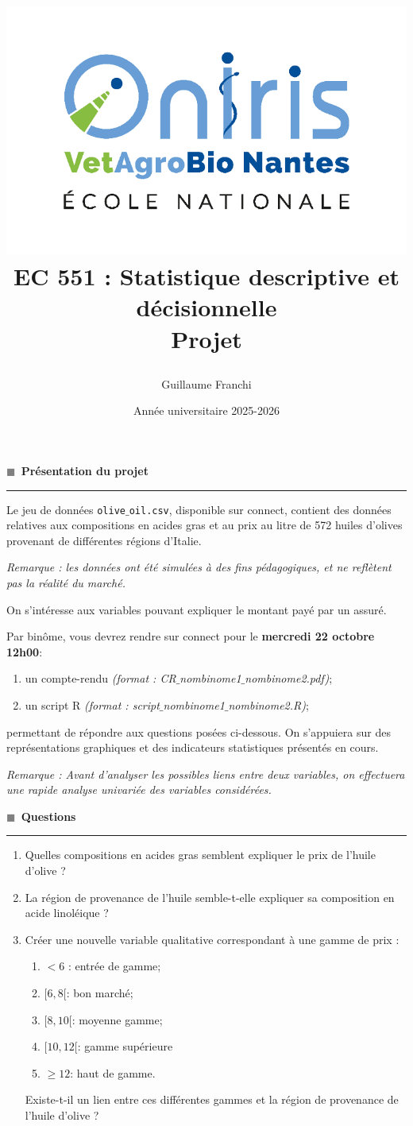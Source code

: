 \documentclass[a4paper,12pt]{article}
\title{\begin{normalsize}\textbf{
\includegraphics[scale=0.25]{logo_oniris.png} \\
EC 551 : Statistique descriptive et décisionnelle
 \\ Projet}
\end{normalsize}}
\author{{\small Guillaume Franchi}}
\date{{\small Année universitaire 2025-2026}}
\makeatletter
\newcommand{\greysquare}{\textcolor{gray}{$\blacksquare$}}
\def\vhrulefill#1{\leavevmode\leaders\hrule\@height#1\hfill \kern\z@}
\newcommand{\sstitre}[1]{\greysquare \ \textbf{\textsf{{\Large #1}}} \textcolor{gray}{\vhrulefill{2pt}} \medskip }
\makeatother
\begin{document}
\maketitle

\sstitre{Présentation du projet}

Le jeu de données \texttt{olive$\_$oil.csv}, disponible sur connect, contient des données relatives aux compositions en acides gras et au prix au litre de 572 huiles d'olives provenant de différentes régions d'Italie.

\medskip

\emph{Remarque : les données ont été simulées à des fins pédagogiques, et ne reflètent pas la réalité du marché.}

\medskip

On s'intéresse aux variables pouvant expliquer le montant payé par un assuré.

\medskip

Par binôme, vous devrez rendre sur connect pour le \textbf{mercredi 22 octobre 12h00}:
	\begin{enumerate}[label=$\bullet$]
	\item un compte-rendu \emph{(format : CR$\_$nombinome1$\_$nombinome2.pdf)};
	\item un script \textsf{R} \emph{(format : script$\_$nombinome1$\_$nombinome2.R)};
	\end{enumerate}

permettant de répondre aux questions posées ci-dessous. On s'appuiera sur des représentations graphiques et des indicateurs statistiques présentés en cours.

\medskip

\emph{Remarque : Avant d'analyser les possibles liens entre deux variables, on effectuera une rapide analyse univariée des variables considérées.}

\medskip

\sstitre{Questions}

	\begin{enumerate}
	\item Quelles compositions en acides gras semblent expliquer le prix de l'huile d'olive ?
	\item La région de provenance de l'huile semble-t-elle expliquer sa composition en acide linoléique ?
	\item Créer une nouvelle variable qualitative correspondant à une gamme de prix :
	\begin{enumerate}[label=$\bullet$]
	\item $<6$ : entrée de gamme;
	\item $[6,8[$: bon marché;
	\item $[8,10[$: moyenne gamme;
	\item $[10,12[$: gamme supérieure 
	\item $\geqslant 12$: haut de gamme.
	\end{enumerate}
	Existe-t-il un lien entre ces différentes gammes et la région de provenance de l'huile d'olive ?
	\end{enumerate}
\end{document}
